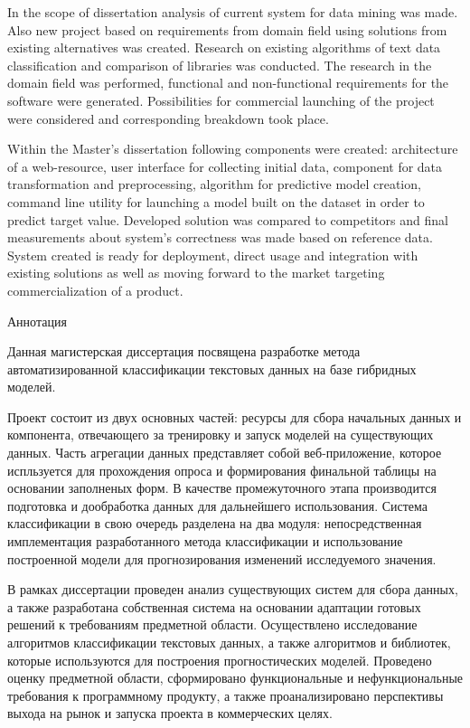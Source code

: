 In the scope of dissertation analysis of current system for data mining was made. Also new project based on requirements from domain field using solutions from existing alternatives was created. Research on existing algorithms of text data classification and comparison of libraries was conducted. The research in the domain field was performed, functional and non-functional requirements for the software were generated. Possibilities for commercial launching of the project were considered and corresponding breakdown took place.

Within the Master's dissertation following components were created: architecture of a web-resource, user interface for collecting initial data, component for data transformation and preprocessing, algorithm for predictive model creation, command line utility for launching a model built on the dataset in order to predict target value. Developed solution was compared to competitors and final measurements about system's correctness was made based on reference data. System created is ready for deployment, direct usage and integration with existing solutions as well as moving forward to the market targeting commercialization of a product.

Аннотация

Данная магистерская диссертация посвящена разработке метода автоматизированной классификации текстовых данных на базе гибридных моделей.

Проект состоит из двух основных частей: ресурсы для сбора начальных данных и компонента, отвечающего за тренировку и запуск моделей на существующих данных. Часть агрегации данных представляет собой веб-приложение, которое испльзуется для прохождения опроса и формирования финальной таблицы на основании заполненых форм. В качестве промежуточного этапа производится подготовка и дообработка данных для дальнейшего использования. Система классификации в свою очередь разделена на два модуля: непосредственная имплементация разработанного метода классификации и использование построенной модели для прогнозирования изменений исследуемого значения.

В рамках диссертации проведен анализ существующих систем для сбора данных, а также разработана собственная система на основании адаптации готовых решений к требованиям предметной области. Осуществлено исследование алгоритмов классификации текстовых данных, а также алгоритмов и библиотек, которые используются для построения прогностических моделей. Проведено оценку предметной области, сформировано функциональные и нефункциональные требования к программному продукту, а также проанализировано перспективы выхода на рынок и запуска проекта в коммерческих целях.

